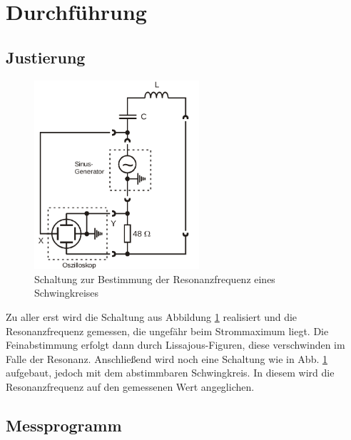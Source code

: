 \newpage
\section{Durchführung}
\label{sec:Durchführung}
\subsection{Justierung}
\begin{figure}
  \centering
  \includegraphics[height= 7cm]{./logos/Abb5.png}
  \caption{Schaltung zur Bestimmung der Resonanzfrequenz eines Schwingkreises\cite{sample}}
  \label{fig:Abb5}
\end{figure}
\FloatBarrier
Zu aller erst wird die Schaltung aus Abbildung \ref{fig:Abb5} realisiert und die Resonanzfrequenz gemessen, die ungefähr beim Strommaximum liegt. Die Feinabstimmung
erfolgt dann durch Lissajous-Figuren, diese verschwinden im Falle der Resonanz. Anschließend wird  noch eine Schaltung wie in Abb. \ref{fig:Abb5} aufgebaut, jedoch mit dem
abstimmbaren Schwingkreis. In diesem wird die Resonanzfrequenz auf den gemessenen Wert angeglichen.
\newpage
\subsection{Messprogramm}
